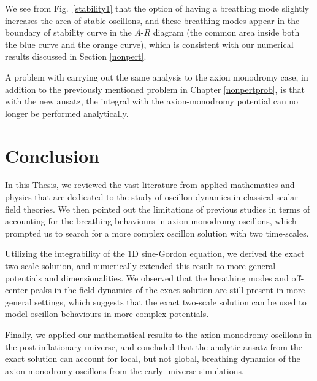 \documentclass{report}
\begin{document}
We see from Fig.~\ref{stability1} that the option of having a breathing mode slightly increases the area of stable oscillons, and these breathing modes appear in the boundary of stability curve in the $A$-$R$ diagram (the common area inside both the blue curve and the orange curve), which is consistent with our numerical results discussed in Section \ref{nonpert}.

A problem with carrying out the same analysis to the axion monodromy case, in addition to the previously mentioned problem in Chapter \ref{nonpertprob}, is that with the new ansatz, the integral with the axion-monodromy potential can no longer be performed analytically.

\chapter{Conclusion}

In this Thesis, we reviewed the vast literature from applied mathematics and physics that are dedicated to the study of oscillon dynamics in classical scalar field theories. We then pointed out the limitations of previous studies in terms of accounting for the breathing behaviours in axion-monodromy oscillons, which prompted us to search for a more complex oscillon solution with two time-scales.

Utilizing the integrability of the 1D sine-Gordon equation, we derived the exact two-scale solution, and numerically extended this result to more general potentials and dimensionalities. We observed that the breathing modes and off-center peaks in the field dynamics of the exact solution are still present in more general settings, which suggests that the exact two-scale solution can be used to model oscillon behaviours in more complex potentials.

Finally, we applied our mathematical results to the axion-monodromy oscillons in the post-inflationary universe, and concluded that the analytic ansatz from the exact solution can account for local, but not global, breathing dynamics of the axion-monodromy oscillons from the early-universe simulations.



\end{document}
